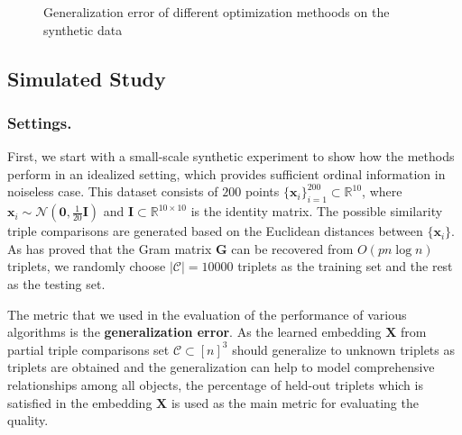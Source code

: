 \documentclass[letterpaper]{article}
\begin{document}
\begin{figure}
{			}
			\caption{Generalization error of different optimization methoods on the synthetic data}
			\label{fig:1} %
		\end{figure}

		\subsection{Simulated Study}

		\subsubsection{Settings.}
		First, we start with a small-scale synthetic experiment to show how the methods perform in an idealized setting, which provides sufficient ordinal information in noiseless case. This dataset consists of $200$ points $\{\mathbf{x}_i\}_{i=1}^{200}\subset\mathbb{R}^{10}$, where $\mathbf{x}_i\sim\mathcal{N}(\mathbf{0}, \frac{1}{20}\mathbf{I})$ and $\mathbf{I}\subset\mathbb{R}^{10\times 10}$ is the identity matrix. The possible similarity triple comparisons are generated based on the Euclidean distances between $\{\mathbf{x}_i\}$. As \cite{2016arXiv160607081J} has proved that the Gram matrix $\mathbf{G}$ can be recovered from $O(pn\log n)$ triplets, we randomly choose $|\mathcal{C}|=10000$ triplets as the training set and the rest as the testing set.

		The metric that we used in the evaluation of the performance of various algorithms is the \textbf{generalization error}. As the learned embedding $\mathbf{X}$ from partial triple comparisons set $\mathcal{C}\subset[n]^3$ should generalize to unknown triplets as triplets are obtained and the generalization can help to model comprehensive relationships among all objects, the percentage of held-out triplets which is satisfied in the embedding $\mathbf{X}$ is used as the main metric for evaluating the quality.
\end{document}
